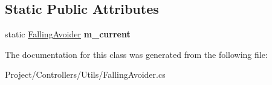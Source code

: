 \subsection*{Static Public Attributes}
\begin{DoxyCompactItemize}
\item 
\mbox{\label{class_falling_avoider_aefc03633515d8eb72a77c954a55d7999}} 
static \hyperlink{class_falling_avoider}{Falling\+Avoider} {\bfseries m\+\_\+current}
\end{DoxyCompactItemize}


The documentation for this class was generated from the following file\+:\begin{DoxyCompactItemize}
\item 
Project/\+Controllers/\+Utils/Falling\+Avoider.\+cs\end{DoxyCompactItemize}
